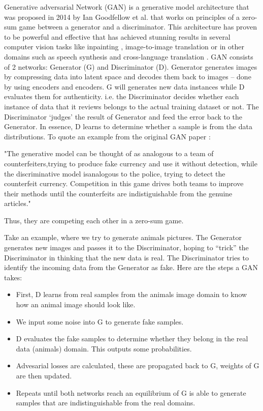 \documentclass[12pt]{report}
\begin{document}
Generative adversarial Network (GAN) is a generative model architecture that was proposed in 2014 by Ian Goodfellow et al.\cite{gan} that works on principles of a zero-sum game between a generator and a discriminator. This architecture has proven to be powerful and effective that has achieved stunning results in several computer vision tasks like inpainting \cite{image-completion}, image-to-image translation \cite{cycle-gan} or in other domains such as speech synthesis \cite{audio-gan} and cross-language translation \cite{nlp}.
GAN consists of 2 networks: Generator (G) and Discriminator (D). Generator generates images by compressing data into latent space and decodes them back to images – done by using encoders and encoders. G will generates new data instances while D evaluates them for authenticity. i.e. the Discriminator decides whether each instance of data that it reviews belongs to the actual training dataset or not. The Discriminator ‘judges’ the result of Generator and feed the error back to the Generator. In essence, D learns to determine whether a sample is from the data distributions. To quote an example from the original GAN paper \cite{gan}:

"The generative model can be thought of as analogous to a team of counterfeiters,trying  to  produce  fake  currency  and  use  it  without  detection,  while  the  discriminative  model  isanalogous to the police, trying to detect the counterfeit currency. Competition in this game drives both teams to improve their methods until the counterfeits are indistiguishable from the genuine articles."

Thus, they are competing each other in a zero-sum game.

Take an example, where we try to generate animals pictures. The Generator generates new images and passes it to the Discriminator, hoping to “trick” the Discriminator in thinking that the new data is real. The Discriminator tries to identify the incoming data from the Generator as fake.
Here are the steps a GAN takes:
\begin{itemize}
	\item First, D learns from real samples from the animals image domain to know how an animal image should look like.
	\item We input some noise into G to generate fake samples.
	\item D evaluates the fake samples to determine whether they belong in the real data (animals) domain. This outputs some probabilities. 
	\item Advesarial losses are calculated, these are propagated back to G, weights of G are then updated.
	\item Repeats until both networks reach an equilibrium of G is able to generate samples that are indistinguishable from the real domains.
\end{itemize}
\end{document}

